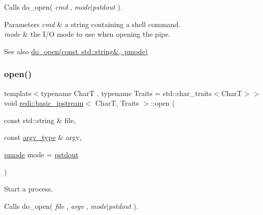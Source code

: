Calls do\+\_\+open( {\itshape cmd} , {\itshape mode$\vert$pstdout} ).


\begin{DoxyParams}{Parameters}
{\em cmd} & a string containing a shell command. \\
\hline
{\em mode} & the I/O mode to use when opening the pipe. \\
\hline
\end{DoxyParams}
\begin{DoxySeeAlso}{See also}
\mbox{\hyperlink{classredi_1_1pstream__common_a2505ab3e3a834b92d98b5bcb97734dfe}{do\+\_\+open(const std\+::string\&, pmode)}} 
\end{DoxySeeAlso}
\mbox{\label{classredi_1_1basic__ipstream_a99a26c32db5009fe0be34efb466a9eea}} 
\subsubsection{\texorpdfstring{open()}{open()}\hspace{0.1cm}{\footnotesize\ttfamily [2/2]}}
{\footnotesize\ttfamily template$<$typename CharT , typename Traits  = std\+::char\+\_\+traits$<$\+Char\+T$>$$>$ \\
void \mbox{\hyperlink{classredi_1_1basic__ipstream}{redi\+::basic\+\_\+ipstream}}$<$ CharT, Traits $>$\+::open (\begin{DoxyParamCaption}\item[{const std\+::string \&}]{file,  }\item[{const \mbox{\hyperlink{structredi_1_1pstreams_af902b894b095c1875e96c10129489467}{argv\+\_\+type}} \&}]{argv,  }\item[{\mbox{\hyperlink{structredi_1_1pstreams_a1eae4aad88812af03a0fbb3ec13c50b7}{pmode}}}]{mode = {\ttfamily \mbox{\hyperlink{structredi_1_1pstreams_ad3c6d53a98de4566478b1c40c101a42b}{pstdout}}} }\end{DoxyParamCaption})\hspace{0.3cm}{\ttfamily [inline]}}



Start a process. 

Calls do\+\_\+open( {\itshape file} , {\itshape argv} , {\itshape mode$\vert$pstdout} ).


